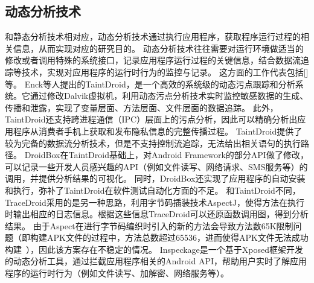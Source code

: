 \subsection{动态分析技术}

和静态分析技术相对应，动态分析技术通过执行应用程序，获取程序运行过程的相关信息，从而实现对应的研究目的。
动态分析技术往往需要对运行环境做适当的修改或者调用特殊的系统接口，记录应用程序运行过程的关键信息，结合数据流追踪等技术，实现对应用程序的运行时行为的监控与记录。
这方面的工作代表包括[]等。
Enck等人提出的TaintDroid\cite{chun2014taintdroid}，是一个高效的系统级的动态污点跟踪和分析系统。它通过修改Dalvik虚拟机，利用动态污点分析技术实时监控敏感数据的生成、传播和泄露，实现了变量层面、方法层面、文件层面的数据追踪。
此外，TaintDroid还支持跨进程通信（IPC）层面上的污点分析，因此可以精确分析出应用程序从消费者手机上获取和发布隐私信息的完整传播过程。
TaintDroid提供了较为完备的数据流分析技术，但是不支持控制流追踪，无法给出相关语句的执行路径。
DroidBox\cite{droidbox:online}在TaintDroid基础上，对Android Framework的部分API做了修改，可以记录一些开发人员感兴趣的API（例如文件读写、网络请求、SMS服务等）的调用，并提供分析结果的可视化。
同时，DroidBox还实现了应用程序的自动安装和执行，弥补了TaintDroid在软件测试自动化方面的不足。
和TaintDroid不同，TraceDroid\cite{van2013dynamic}采用的是另一种思路，利用字节码插装技术AspectJ，使得方法在执行时输出相应的日志信息。根据这些信息TraceDroid可以还原函数调用图，得到分析结果。
由于Aspect在进行字节码编织时引入的新的方法会导致方法数65K限制问题（即构建APK文件的过程中，方法总数超过65536，进而使得APK文件无法成功构建~\cite{Configur27}），因此该方案存在不稳定的情况。
Inspeckage\cite{acpmInsp34}是一个基于Xposed框架开发的动态分析工具，通过拦截应用程序相关的Android API，帮助用户实时了解应用程序的运行时行为（例如文件读写、加解密、网络服务等）。



